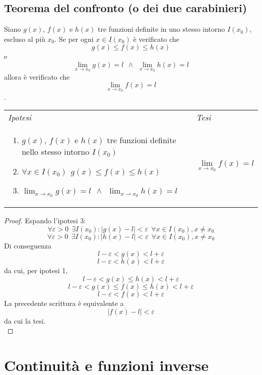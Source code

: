 \documentclass{article}     %
\begin{document}
    \subsection{Teorema del confronto (o dei due carabinieri)}
        \begin{shadedTheorem}[Confronto]
            Siano $g(x)$, $f(x)$ e $h(x)$ tre funzioni definite in uno stesso intorno $I(x_0)$, escluso al più $x_0$. Se per ogni $x\in I(x_0)$ è verificato che \[g(x)\leq f(x) \leq h(x)\]
            e \[\lim_{x\rightarrow x_0} g(x)=l ~~ \land ~~ \lim_{x\rightarrow x_0} h(x)=l\]
            allora è verificato che
            \[\lim_{x\rightarrow x_0} f(x)=l\].
        \end{shadedTheorem}
        \begin{tabular}{m{}m{}}
            \textit{Ipotesi} & \textit{Tesi}  \\
            \begin{enumerate}
                \item $g(x)$, $f(x)$ e $h(x)$ tre funzioni definite nello stesso intorno $I(x_0)$
                \item $\forall x \in I(x_0) ~~ g(x)\leq f(x) \leq h(x)$
                \item $\displaystyle\lim_{x\rightarrow x_0} g(x)=l ~~ \land ~~ \lim_{x\rightarrow x_0} h(x)=l$
            \end{enumerate} & \[\lim_{x\rightarrow x_0} f(x)=l\]\\
        \end{tabular}
        
        \begin{proof}
            Espando l'ipotesi 3:
            \[\forall \varepsilon > 0 ~~\exists I(x_0) : |g(x)-l|<\varepsilon~~\forall x \in I(x_0), x\neq x_0\]
            \[\forall \varepsilon > 0 ~~\exists I(x_0) : |h(x)-l|<\varepsilon~~\forall x \in I(x_0), x\neq x_0\]
            Di conseguenza 
            \[l-\varepsilon < g(x) <l+\varepsilon\]
            \[l-\varepsilon < h(x) <l+\varepsilon\]
            da cui, per ipotesi 1, 
            \[l-\varepsilon < g(x)\leq h(x) <l+\varepsilon\]
            \[l-\varepsilon < g(x) \leq f(x) \leq h(x) <l+\varepsilon\]
            \[l-\varepsilon < f(x) <l+\varepsilon\]
            La precedente scrittura è equivalente a 
            \[|f(x)-l|<\varepsilon\]
            da cui la tesi.\\
        \end{proof}
    
\section{Continuità e funzioni inverse}
\end{document}
